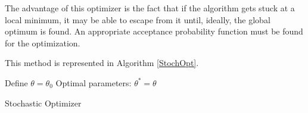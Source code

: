 The advantage of this optimizer is the fact that if the algorithm gets stuck at a local minimum, it may be able to escape from it until, ideally, the global optimum is found. An appropriate acceptance probability function must be found for the optimization.

This method is represented in Algorithm \ref{StochOpt}.

\begin{algorithm}[H]\label{StochOpt}
\DontPrintSemicolon
 Define $\theta=\theta_0$
 Optimal parameters: $\theta^{*}=\theta$\;
 \caption{Stochastic Optimizer}
\end{algorithm}
\ 
\fi






